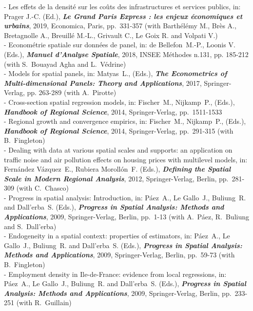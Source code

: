 \documentclass[a4paper,12pt]{article}
\begin{document}
- Les effets de la densité sur les coûts des infrastructures et services publics, in: Prager J.-C. (Ed.), \textit{\textbf{Le Grand Paris Express : les enjeux économiques et urbains}}, 2019, Economica, Paris, pp.~331-357 (with Barthélémy M., Brès A., Bretagnolle A., Breuillé M.-L., Grivault C., Le Goix R. and Volpati V.) \\
- Econométrie spatiale sur données de panel, in: de Bellefon~M.-P., Loonis V. (Eds.), \textit{\textbf{Manuel d'Analyse Spatiale}}, 2018, INSEE Méthodes n.131, pp. 185-212 (with S.~Bouayad Agha and L.~Védrine) \\
- Models for spatial panels, in: Matyas~L., (Eds.), \textit{\textbf{The Econometrics of Multi-dimensional Panels: Theory and Applications}}, 2017, Springer-Verlag, pp. 263-289 (with A.~Pirotte) \\
- Cross-section spatial regression models, in: Fischer~M., Nijkamp~P., (Eds.), \textit{\textbf{Handbook of Regional Science}}, 2014, Springer-Verlag, pp.~1511-1533 \\
- Regional growth and convergence empirics, in: Fischer~M., Nijkamp~P., (Eds.), \textit{\textbf{Handbook of Regional Science}}, 2014, Springer-Verlag, pp.~291-315 (with B.~Fingleton) \\
- Dealing with data at various spatial scales and supports: an application on traffic noise and air pollution effects on housing prices with multilevel models, in: Fernández Vázquez~E., Rubiera Morollón~F. (Eds.), \textit{\textbf{Defining the Spatial Scale in Modern Regional Analysis}}, 2012, Springer-Verlag, Berlin, pp.~281-309 (with C.~Chasco) \\
- Progress in spatial analysis: Introduction, in: Páez~A., Le Gallo~J., Buliung~R. and Dall'erba~S. (Eds.), \textit{\textbf{Progress in Spatial Analysis: Methods and Applications}}, 2009, Springer-Verlag, Berlin, pp.~1-13 (with A.~Páez, R.~Buliung and S.~Dall'erba) \\
- Endogeneity in a spatial context: properties of estimators, in: Páez~A., Le Gallo~J., Buliung~R. and Dall'erba~S. (Eds.), \textit{\textbf{Progress in Spatial Analysis: Methods and Applications}}, 2009, Springer-Verlag, Berlin, pp.~59-73 (with B.~Fingleton) \\
- Employment density in Ile-de-France: evidence from local regressions, in: Páez~A., Le Gallo~J., Buliung~R. and Dall'erba~S. (Eds.), \textit{\textbf{Progress in Spatial Analysis: Methods and Applications}}, 2009, Springer-Verlag, Berlin, pp.~233-251 (with R.~Guillain) \\
\end{document}
